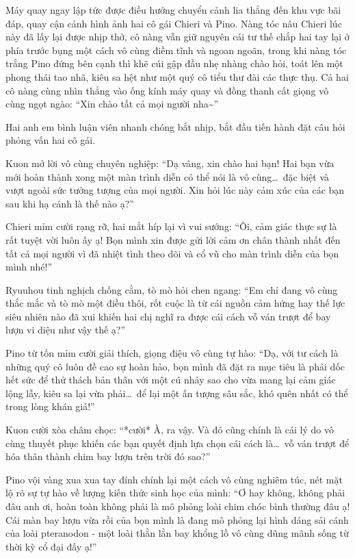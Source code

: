 \documentclass[../main.tex]{subfiles}
\begin{document}
Máy quay ngay lập tức được điều hướng chuyển cảnh lia thẳng đến khu vực bãi đáp, quay cận cảnh hình ảnh hai cô gái Chieri và Pino. Nàng tóc nâu Chieri lúc này đã lấy lại được nhịp thở, cô nàng vẫn giữ nguyên cái tư thế chắp hai tay lại ở phía trước bụng một cách vô cùng điềm tĩnh và ngoan ngoãn, trong khi nàng tóc trắng Pino đứng bên cạnh thì khẽ cúi gập đầu nhẹ nhàng chào hỏi, toát lên một phong thái tao nhã, kiêu sa hệt như một quý cô tiểu thư đài các thực thụ. Cả hai cô nàng cùng nhìn thẳng vào ống kính máy quay và đồng thanh cất giọng vô cùng ngọt ngào: ``Xin chào tất cả mọi người nha\~{}''

Hai anh em bình luận viên nhanh chóng bắt nhịp, bắt đầu tiến hành đặt câu hỏi phỏng vấn hai cô gái.

Kuon mở lời vô cùng chuyên nghiệp: ``Dạ vâng, xin chào hai bạn! Hai bạn vừa mới hoàn thành xong một màn trình diễn có thể nói là vô cùng\dots\ đặc biệt và vượt ngoài sức tưởng tượng của mọi người. Xin hỏi lúc này cảm xúc của các bạn sau khi hạ cánh là thế nào ạ?''

Chieri mỉm cười rạng rỡ, hai mắt híp lại vì vui sướng: ``Ôi, cảm giác thực sự là rất tuyệt vời luôn ấy ạ! Bọn mình xin được gửi lời cảm ơn chân thành nhất đến tất cả mọi người vì đã nhiệt tình theo dõi và cổ vũ cho màn trình diễn của bọn mình nhé!''

Ryuuhou tinh nghịch chống cằm, tò mò hỏi chen ngang: ``Em chỉ đang vô cùng thắc mắc và tò mò một điều thôi, rốt cuộc là từ cái nguồn cảm hứng hay thế lực siêu nhiên nào đã xui khiến hai chị nghĩ ra được cái cách vỗ ván trượt để bay lượn vi diệu như vậy thế ạ?''

Pino từ tốn mỉm cười giải thích, giọng điệu vô cùng tự hào: ``Dạ, với tư cách là những quý cô luôn đề cao sự hoàn hảo, bọn mình đã đặt ra mục tiêu là phải dốc hết sức để thử thách bản thân với một cú nhảy sao cho vừa mang lại cảm giác lộng lẫy, kiêu sa lại vừa phải\dots\ để lại một ấn tượng sâu sắc, khó quên nhất có thể trong lòng khán giả!''

Kuon cười xòa châm chọc: ``*cười* À, ra vậy. Và đó cũng chính là cái lý do vô cùng thuyết phục khiến các bạn quyết định lựa chọn cái cách là\dots\ vỗ ván trượt để hóa thân thành chim bay lượn trên trời đó sao?''

Pino vội vàng xua xua tay đính chính lại một cách vô cùng nghiêm túc, nét mặt lộ rõ sự tự hào về lượng kiến thức sinh học của mình: ``Ơ hay không, không phải đâu anh ơi, hoàn toàn không phải là mô phỏng loài chim chóc bình thường đâu ạ! Cái màn bay lượn vừa rồi của bọn mình là đang mô phỏng lại hình dáng sải cánh của loài pteranodon - một loài thằn lằn bay khổng lồ vô cùng dũng mãnh sống từ thời kỳ cổ đại đấy ạ!''
\end{document}
